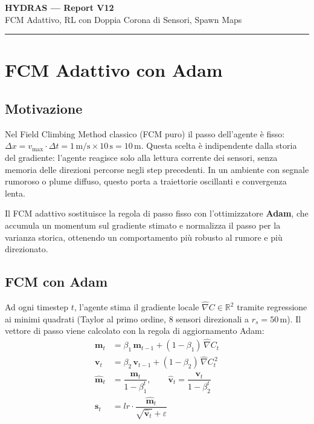 \documentclass[12pt, a4paper]{article}
\begin{document}
\begin{center}
    {\LARGE\bfseries HYDRAS --- Report V12}\\[6pt]
    {\large FCM Adattivo, RL con Doppia Corona di Sensori, Spawn Maps}
\end{center}
\vspace{0.3cm}
\hrule
\vspace{0.5cm}

\section{FCM Adattivo con Adam}

\subsection{Motivazione}

Nel Field Climbing Method classico (FCM puro) il passo dell'agente \`e fisso:
$\Delta x = v_{\max} \cdot \Delta t = 1\,\text{m/s} \times 10\,\text{s} = 10\,\text{m}$.
Questa scelta \`e indipendente dalla storia del gradiente: l'agente reagisce solo alla
lettura corrente dei sensori, senza memoria delle direzioni percorse negli step precedenti.
In un ambiente con segnale rumoroso o plume diffuso, questo porta a traiettorie oscillanti
e convergenza lenta.

Il FCM adattivo sostituisce la regola di passo fisso con l'ottimizzatore \textbf{Adam},
che accumula un momentum sul gradiente stimato e normalizza il passo per la varianza
storica, ottenendo un comportamento pi\`u robusto al rumore e pi\`u direzionato.

\subsection{FCM con Adam}

Ad ogni timestep $t$, l'agente stima il gradiente locale $\hat{\nabla}C \in \mathbb{R}^2$
tramite regressione ai minimi quadrati (Taylor al primo ordine, 8 sensori direzionali a
$r_s = 50\,\text{m}$).
Il vettore di passo viene calcolato con la regola di aggiornamento Adam:
\begin{align}
    \mathbf{m}_t &= \beta_1\,\mathbf{m}_{t-1} + (1-\beta_1)\,\hat{\nabla}C_t \\
    \mathbf{v}_t &= \beta_2\,\mathbf{v}_{t-1} + (1-\beta_2)\,\hat{\nabla}C_t^{\,2} \\
    \hat{\mathbf{m}}_t &= \dfrac{\mathbf{m}_t}{1-\beta_1^t}, \qquad
    \hat{\mathbf{v}}_t = \dfrac{\mathbf{v}_t}{1-\beta_2^t} \\[4pt]
    \mathbf{s}_t &= lr \cdot \dfrac{\hat{\mathbf{m}}_t}{\sqrt{\hat{\mathbf{v}}_t} + \varepsilon}
\end{align}
\end{document}
